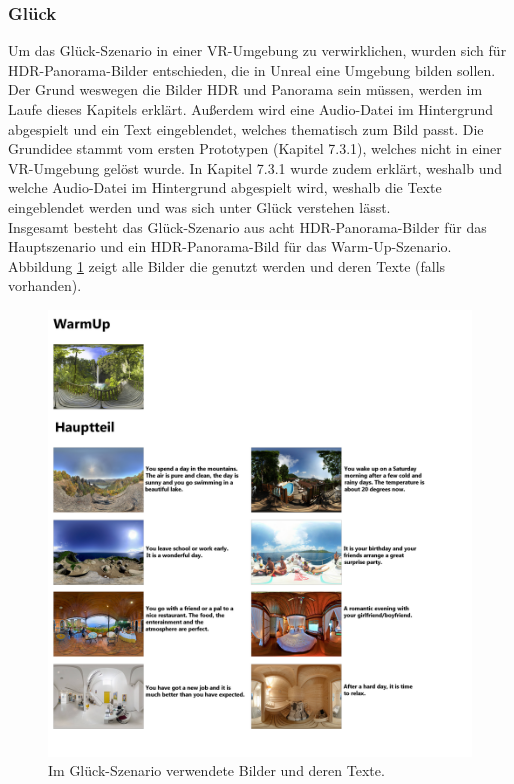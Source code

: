 \subsubsection{Gl{\"u}ck} \label{glueck-4}


Um das Gl{\"u}ck-Szenario in einer VR-Umgebung zu verwirklichen, wurden sich f{\"u}r HDR-Panorama-Bilder entschieden, die in Unreal eine Umgebung bilden sollen. 
Der Grund weswegen die Bilder HDR und Panorama sein m{\"u}ssen, werden im Laufe dieses Kapitels erkl{\"a}rt. 
Au{\ss}erdem wird eine Audio-Datei im Hintergrund abgespielt und ein Text eingeblendet, welches thematisch zum Bild passt. 
Die Grundidee stammt vom ersten Prototypen (Kapitel 7.3.1), welches nicht in einer VR-Umgebung gel{\"o}st wurde. 
In Kapitel 7.3.1 wurde zudem erkl{\"a}rt, weshalb und welche Audio-Datei im Hintergrund abgespielt wird, weshalb die Texte eingeblendet werden und was sich unter Gl{\"u}ck verstehen l{\"a}sst. \\

Insgesamt besteht das Gl{\"u}ck-Szenario aus acht HDR-Panorama-Bilder f{\"u}r das Hauptszenario und ein HDR-Panorama-Bild f{\"u}r das Warm-Up-Szenario. 
Abbildung \ref{fig-glueck4} zeigt alle Bilder die genutzt werden und deren Texte (falls vorhanden). \\

\begin{figure}[H] \centering
\includegraphics[width=15cm]{Images/gluck4.png} 
\vspace{-0.3cm} 
\caption[Im Gl{\"u}ck-Szenario verwendete Bilder und deren Texte]{Im Gl{\"u}ck-Szenario verwendete Bilder und deren Texte\cite{sun360}.}
\label{fig-glueck4} 
\end{figure}


